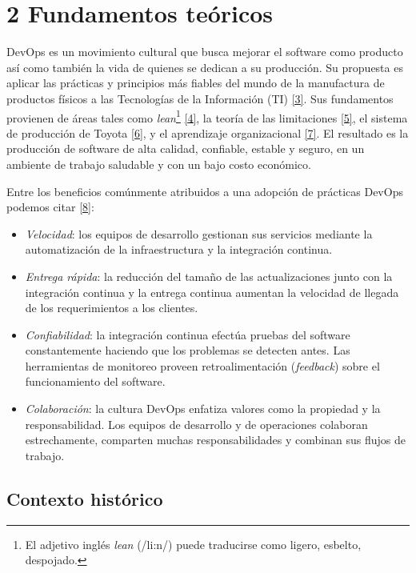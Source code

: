 \section{2 Fundamentos teóricos}

DevOps es un movimiento cultural que busca mejorar el software como producto así como también la vida de quienes se dedican a su producción. Su propuesta es aplicar las prácticas y principios más fiables del mundo de la manufactura de productos físicos a las Tecnologías de la Información (TI) \href{https://www.zotero.org/google-docs/?Qv2jNu}{[3]}. Sus fundamentos provienen de áreas tales como \textit{lean}\footnote{ El adjetivo inglés \textit{lean} (/li:n/) puede traducirse como ligero, esbelto, despojado.} \href{https://www.zotero.org/google-docs/?fSFDw6}{[4]}, la teoría de las limitaciones \href{https://www.zotero.org/google-docs/?Zt3ITa}{[5]}, el sistema de producción de Toyota \href{https://www.zotero.org/google-docs/?1gBbFC}{[6]}, y el aprendizaje organizacional \href{https://www.zotero.org/google-docs/?SxxXGE}{[7]}. El resultado es la producción de software de alta calidad, confiable, estable y seguro, en un ambiente de trabajo saludable y con un bajo costo económico.

Entre los beneficios comúnmente atribuidos a una adopción de prácticas DevOps podemos citar \href{https://www.zotero.org/google-docs/?JNLnw4}{[8]}:

\begin{itemize}
\item \textit{Velocidad}: los equipos de desarrollo gestionan sus servicios mediante la automatización de la infraestructura y la integración continua.
\item \textit{Entrega rápida}: la reducción del tamaño de las actualizaciones junto con la integración continua y la entrega continua aumentan la velocidad de llegada de los requerimientos a los clientes.
\item \textit{Confiabilidad}: la integración continua efectúa pruebas del software constantemente haciendo que los problemas se detecten antes. Las herramientas de monitoreo proveen retroalimentación (\textit{feedback}) sobre el funcionamiento del software.
\item \textit{Colaboración}: la cultura DevOps enfatiza valores como la propiedad y la responsabilidad. Los equipos de desarrollo y de operaciones colaboran estrechamente, comparten muchas responsabilidades y combinan sus flujos de trabajo.
\end{itemize}
\subsection{Contexto histórico}

